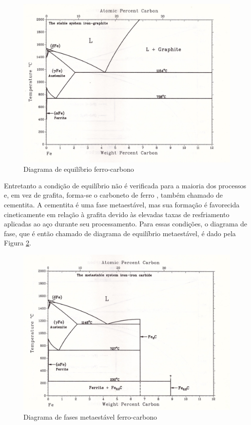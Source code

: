 \documentclass[brazil,tf,epusp]{usp}  %
\begin{document}
\begin{figure}[ht!]
  \includegraphics[width=.8\textwidth,angle=180]{img/Fe-C.jpg}
  \caption{Diagrama de equilíbrio ferro-carbono \cite{Massalski1996v1}}
  \label{fig:diagrama_fe-c}
\end{figure}

Entretanto a condição de equilíbrio não é verificada para a maioria dos processos e, em vez de grafita, forma-se o carboneto de ferro , também chamado de cementita. A cementita é uma fase metaestável, mas sua formação é favorecida cineticamente em relação à grafita devido às elevadas taxas de resfriamento aplicadas ao aço durante seu processamento.
Para essas condições, o diagrama de fase, que é então chamado de diagrama de equilíbrio metaestável, é dado pela Figura \ref{fig:diagrama_fe-c_meta}.

\begin{figure}[ht!]
  \includegraphics[width=.8\textwidth,angle=180]{img/Fe-C_meta.jpg}
  \caption{Diagrama de fases metaestável ferro-carbono \cite{Massalski1996v1}}
  \label{fig:diagrama_fe-c_meta}
\end{figure}
\end{document}
